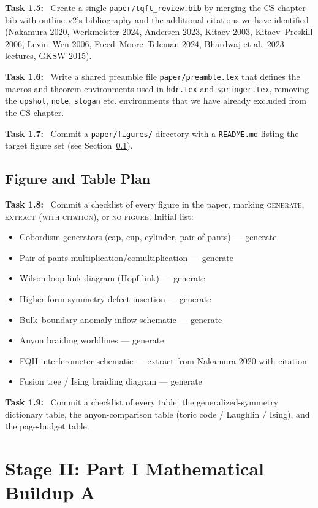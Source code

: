 \documentclass[11pt]{article}
\newcommand{\task}[1]{\medskip\noindent\textbf{Task #1:}\ }
\begin{document}
\task{1.5} Create a single \texttt{paper/tqft\_review.bib} by merging the CS chapter
bib with outline v2's bibliography and the additional citations we have identified
(Nakamura 2020, Werkmeister 2024, Andersen 2023, Kitaev 2003, Kitaev--Preskill 2006,
Levin--Wen 2006, Freed--Moore--Teleman 2024, Bhardwaj et al.~2023 lectures, GKSW 2015).

\task{1.6} Write a shared preamble file \texttt{paper/preamble.tex} that defines the
macros and theorem environments used in \texttt{hdr.tex} and \texttt{springer.tex},
removing the \texttt{upshot}, \texttt{note}, \texttt{slogan} etc. environments that
we have already excluded from the CS chapter.

\task{1.7} Commit a \texttt{paper/figures/} directory with a \texttt{README.md}
listing the target figure set (see Section~\ref{sec:figures}).

\subsection{Figure and Table Plan}\label{sec:figures}

\task{1.8} Commit a checklist of every figure in the paper, marking \textsc{generate},
\textsc{extract (with citation)}, or \textsc{no figure}. Initial list:
\begin{itemize}[leftmargin=2em]
\item Cobordism generators (cap, cup, cylinder, pair of pants) --- generate
\item Pair-of-pants multiplication/comultiplication --- generate
\item Wilson-loop link diagram (Hopf link) --- generate
\item Higher-form symmetry defect insertion --- generate
\item Bulk--boundary anomaly inflow schematic --- generate
\item Anyon braiding worldlines --- generate
\item FQH interferometer schematic --- extract from Nakamura 2020 with citation
\item Fusion tree / Ising braiding diagram --- generate
\end{itemize}

\task{1.9} Commit a checklist of every table: the generalized-symmetry dictionary table,
the anyon-comparison table (toric code / Laughlin / Ising), and the page-budget table.

\section{Stage II: Part I Mathematical Buildup A}\label{sec:stageII}
\end{document}
